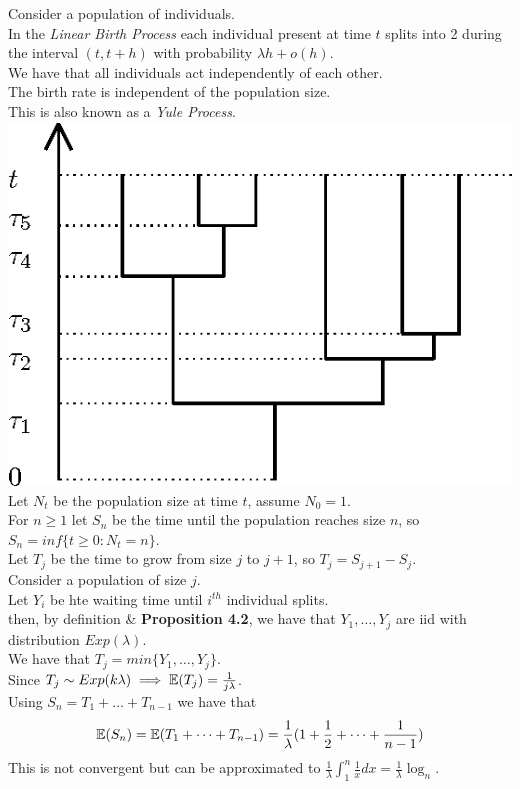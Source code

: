 \documentclass[11pt,a4paper]{article}
\begin{document}
Consider a population of individuals.\\
In the \textit{Linear Birth Process} each individual present at time $t$ splits into 2 during the interval $(t,t+h)$ with probability $\lambda h+o(h)$.\\
We have that all individuals act independently of each other.\\
\nb The birth rate is independent of the population size.\\
\nb This is also known as a \textit{Yule Process}.\\
\includegraphics[scale=0.2]{img/yule.png}\\

Let $N_t$ be the population size at time $t$, assume $N_0=1$.\\
For $n\geq 1$ let $S_n$ be the time until the population reaches size $n$, so $S_n=inf\{t\geq0:N_t=n\}$.\\
Let $T_j$ be the time to grow from size $j$ to $j+1$, so $T_j=S_{j+1}-S_j$.\\
Consider a population of size $j$.\\
Let $Y_i$ be hte waiting time until $i^{th}$ individual splits.\\
then, by definition \& \textbf{Proposition 4.2}, we have that $Y_1,\dots,Y_j$ are iid with distribution $Exp(\lambda)$.\\
We have that $T_j=min\{Y_1,\dots,Y_j\}$.\\
Since $T_j\sim Exp(k\lambda)\implies\mathbb{E}(T_j)=\frac{1}{j\lambda}$.\\
Using $S_n=T_1+\dots+T_{n-1}$ we have that
$$\mathbb{E}(S_n)=\mathbb{E}(T_1+\dots+T_{n-1})=\frac{1}{\lambda}(1+\frac{1}{2}+\dots+\frac{1}{n-1})$$
This is not convergent but can be approximated to $\frac{1}{\lambda}\int_1^n\frac{1}{x}dx=\frac{1}{\lambda}\log_n$.\\
\end{document}
